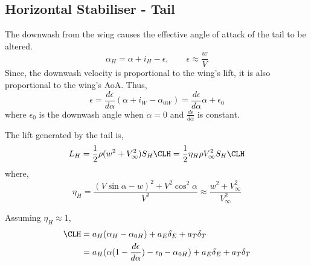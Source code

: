 \subsection{Horizontal Stabiliser - Tail}
The downwash from the wing causes the effective angle of attack of the tail to be altered.
\begin{equation}
  \alpha_H = \alpha + i_H - \epsilon,\qquad \epsilon \approx \frac{w}{V} 
\end{equation}
Since, the downwash velocity is proportional to the wing's lift, it is also proportional to the wing's AoA. Thus,
\begin{equation}
  \epsilon = \frac{d\epsilon}{d\alpha}(\alpha + i_W - \alpha_{0W}) = \frac{d\epsilon}{d\alpha}\alpha + \epsilon_0
\end{equation}
where $\epsilon_0$ is the downwash angle when $\alpha = 0$ and $\frac{d\epsilon}{d\alpha}$ is constant.

The lift generated by the tail is,
\begin{equation}
  L_H = \frac{1}{2}\rho(w^2 + V_\infty^2)S_H\CLH = \frac{1}{2}\eta_H\rho V_\infty^2S_H\CLH 
\end{equation}
where,
\begin{equation}
  \eta_H = \frac{(V\sin\alpha-w)^2+V^2\cos^2\alpha}{V^2} \approx \frac{w^2+V_\infty^2}{V^2_\infty}
\end{equation}

Assuming $\eta_H \approx 1$,
\begin{align}
  \CLH &= a_H(\alpha_H-\alpha_{0H})+a_E\delta_E+a_T\delta_T\\ &= a_H(\alpha(1-\frac{d\epsilon}{d\alpha})-\epsilon_0-\alpha_{0H})+a_E\delta_E+a_T\delta_T
\end{align}
